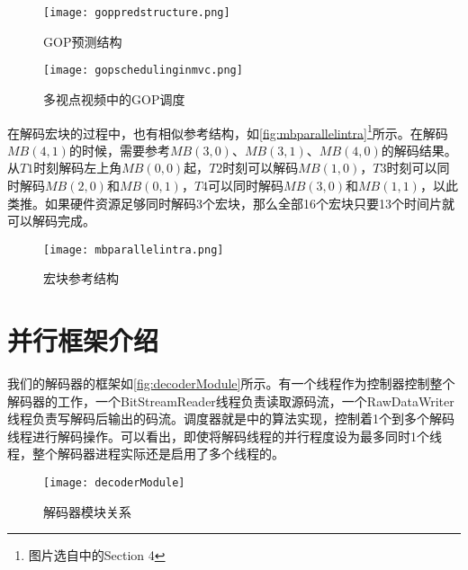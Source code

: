 \begin{figure}[htbp]
\begin{center}
\texttt{[image: goppredstructure.png]}
\caption{GOP预测结构}
\label{fig:goppredstructure}
\end{center}
\end{figure}

\begin{figure}[htbp]
\begin{center}
\texttt{[image: gopschedulinginmvc.png]}
\caption{多视点视频中的GOP调度}
\label{fig:gopschedulinginmvc}
\end{center}
\end{figure}

在解码宏块的过程中，也有相似参考结构，如\autoref{fig:mbparallelintra}\footnote{图片选自中的Section 4}所示。在解码$MB(4,1)$的时候，需要参考$MB(3,0)$、$MB(3,1)$、$MB(4,0)$的解码结果。从$T1$时刻解码左上角$MB(0,0)$起，$T2$时刻可以解码$MB(1,0)$，$T3$时刻可以同时解码$MB(2,0)$和$MB(0,1)$，$T4$可以同时解码$MB(3,0)$和$MB(1,1)$，以此类推。如果硬件资源足够同时解码3个宏块，那么全部16个宏块只要13个时间片就可以解码完成。

\begin{figure}[htbp]
\begin{center}
\texttt{[image: mbparallelintra.png]}
\caption{宏块参考结构}
\label{fig:mbparallelintra}
\end{center}
\end{figure}


\section{并行框架介绍}
\label{sec:parallelstructurebrief}

我们的解码器的框架如\autoref{fig:decoderModule}所示。有一个线程作为控制器控制整个解码器的工作，一个BitStreamReader线程负责读取源码流，一个RawDataWriter线程负责写解码后输出的码流。调度器就是中的算法实现，控制着1个到多个解码线程进行解码操作。可以看出，即使将解码线程的并行程度设为最多同时1个线程，整个解码器进程实际还是启用了多个线程的。

\begin{figure}[htbp]
\begin{center}
\texttt{[image: decoderModule]}
\caption{解码器模块关系}
\label{fig:decoderModule}
\end{center}
\end{figure}



